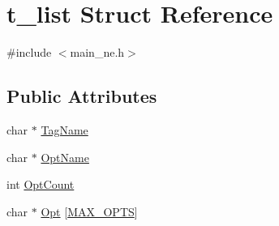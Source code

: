 \hypertarget{structt__list}{\section{t\-\_\-list Struct Reference}
\label{structt__list}
}


{\ttfamily \#include $<$main\-\_\-ne.\-h$>$}

\subsection*{Public Attributes}
\begin{DoxyCompactItemize}
\item 
char $\ast$ \hyperlink{structt__list_aeb59520bc7bc6da831bfe92d683bf92e}{Tag\-Name}
\item 
char $\ast$ \hyperlink{structt__list_abe6fe63801e989339f4c94fd010eba39}{Opt\-Name}
\item 
int \hyperlink{structt__list_a999b775cc4f01f694ce601de094bfc1e}{Opt\-Count}
\item 
char $\ast$ \hyperlink{structt__list_ac140958cb07ab7fb2e88eb138aca658d}{Opt} \mbox{[}\hyperlink{_t_d_d_f_t_2_headers_2params_8h_ac066558381a92837abc23f022405d282}{M\-A\-X\-\_\-\-O\-P\-T\-S}\mbox{]}
\end{DoxyCompactItemize}


